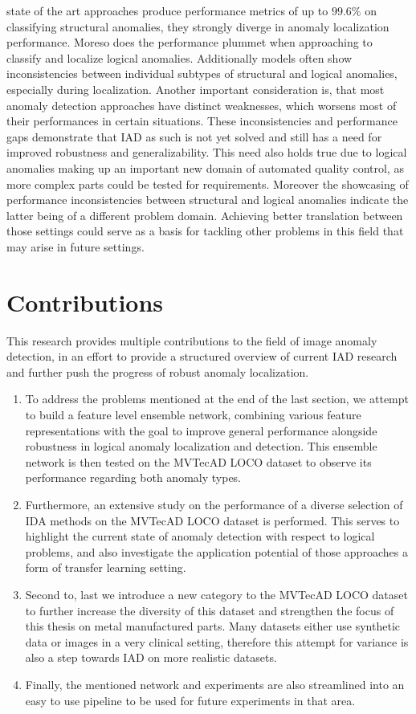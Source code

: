 state of the art approaches produce performance metrics of up to $99.6 \% $ on classifying structural anomalies, they 
strongly diverge in anomaly localization performance. Moreso does the performance plummet when approaching to classify and localize logical 
anomalies. Additionally models often show inconsistencies between individual subtypes of structural and logical anomalies, especially during 
localization. Another important consideration is, that most anomaly detection approaches have distinct weaknesses, which worsens most 
of their performances in certain situations. These inconsistencies and performance gaps demonstrate that IAD as such is not yet solved and still has a need for improved 
robustness and generalizability. This need also holds true due to logical anomalies making up an important new domain of automated 
quality control, as more complex parts could be tested for requirements. Moreover the showcasing of performance inconsistencies between 
structural and logical anomalies indicate the latter being of a different problem domain. Achieving better translation between those 
settings could serve as a basis for tackling other problems in this field that may arise in future settings.


\section{Contributions}
\label{sec:contributions}
This research provides multiple contributions to the field of image anomaly detection, in an effort to provide a structured overview of current IAD research and 
further push the progress of robust anomaly localization. 

\begin{enumerate}
  \item To address the problems mentioned at the end of the last section, we attempt 
  to build a feature level ensemble network, combining various feature representations with the goal to improve 
  general performance alongside robustness in logical anomaly localization and detection. This ensemble network is then tested on 
  the MVTecAD LOCO dataset to observe its performance regarding both anomaly types.
  \item Furthermore, an extensive study on the performance of a diverse selection of IDA methods on the MVTecAD LOCO dataset is performed. 
  This serves to highlight the current state of anomaly detection with respect to logical problems, and also investigate the application potential of 
  those approaches a form of transfer learning setting.
  \item Second to, last we introduce a new category to the MVTecAD LOCO dataset to further increase the diversity of this dataset and strengthen the focus 
  of this thesis on metal manufactured parts. Many datasets either use synthetic data or images in a very clinical setting, therefore this 
  attempt for variance is also a step towards IAD on more realistic datasets.
  \item Finally, the mentioned network and experiments are also streamlined into an easy to use pipeline 
  to be used for future experiments in that area.
\end{enumerate}

